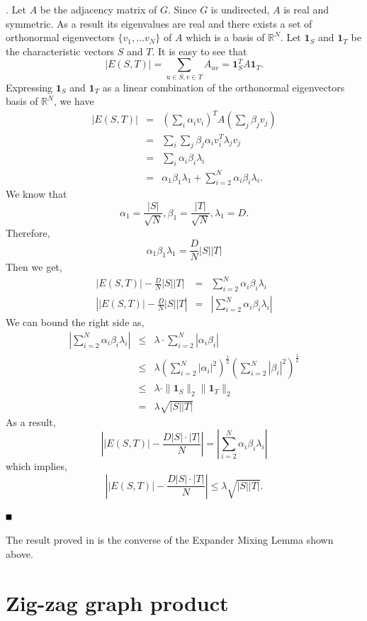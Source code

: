 \documentclass{article}
\newcommand{\bproof}{\noindent{\bf Proof}}
\newcommand{\eproof}{\hspace*{\fill}$\rule{2mm}{2mm}$~~~~\bigskip}
\renewenvironment{proof}{\bproof. }{\eproof}
\newcommand{\R}{\mathbb{R}}
\begin{document}
\begin{proof}
Let $A$ be the adjacency matrix of $G$. Since $G$ is undirected, $A$ is real and symmetric. As a result its eigenvalues are real and there exists a set of orthonormal eigenvectors $\{v_1,\ldots v_N\}$ of $A$ which is a basis of $\R ^N$. Let $\mathbf{1}_S$ and $\mathbf{1}_T$ be the characteristic vectors $S$ and $T$. It is easy to see that
\[
|E(S,T)|=\sum_{u\in S,v\in T}A_{uv}=\mathbf{1}_S^TA\mathbf{1}_T.
\]
Expressing $\mathbf{1}_S$ and $\mathbf{1}_T$ as a linear combination of the orthonormal eigenvectors basis of $\R ^N$, we have
\begin{eqnarray*}
|E(S,T)|&=&(\sum_i\alpha_iv_i)^TA(\sum_j\beta_jv_j)\\
&=&\sum_i\sum_j\beta_j\alpha_iv_i^T\lambda_jv_j\\
&=&\sum_i\alpha_i\beta_i\lambda_i\\
&=&\alpha_1\beta_1\lambda_1+\sum_{i=2}^N\alpha_i\beta_i\lambda_i.
\end{eqnarray*}
We know that
\[
\alpha_1=\frac{|S|}{\sqrt{N}}, \beta_1=\frac{|T|}{\sqrt{N}}, \lambda_1=D.
\]
Therefore,
\[
\alpha_1\beta_1\lambda_1=\frac{D}{N}|S||T|
\]
Then we get,
\begin{eqnarray*}
|E(S,T)|-\frac{D}{N}|S||T|&=&\sum_{i=2}^N\alpha_i\beta_i\lambda_i\\
\left||E(S,T)|-\frac{D}{N}|S||T\right|&=&\left|\sum_{i=2}^N\alpha_i\beta_i\lambda_i\right|
\end{eqnarray*}
We can bound the right side as,
\begin{eqnarray*}
\left|\sum_{i=2}^N\alpha_i\beta_i\lambda_i\right|&\leq&\lambda\cdot\sum_{i=2}^N|\alpha_i\beta_i|\\
&\leq&\lambda\left(\sum_{i=2}^{N}|\alpha_i|^2\right)^{\frac{1}{2}}\left(\sum_{i=2}^{N}|\beta_i|^2\right)^{\frac{1}{2}}\\
&\leq&\lambda\cdot\|\mathbf{1}_S\|_2\|\mathbf{1}_T\|_2\\
&=&\lambda\sqrt{|S||T|}
\end{eqnarray*}
As a result,
\[
\left ||E(S,T)|-\frac{D|S|\cdot |T|}{N}\right |=\left|\sum_{i=2}^N\alpha_i\beta_i\lambda_i\right|
\]
which implies,
\[
\left ||E(S,T)|-\frac{D|S|\cdot |T|}{N}\right |\leq\lambda\sqrt{|S||T|}.
\]

\end{proof}

The result proved in \cite[Lemma 3.3 \& Corollary 5.1]{BL2006} is the converse of the Expander Mixing Lemma shown above.

\section{Zig-zag graph product}
\end{document}
